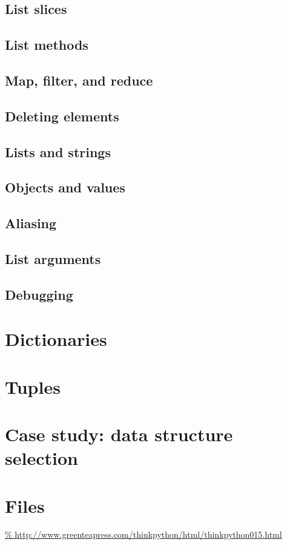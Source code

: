 \documentclass{article}
\begin{document}
\subsection{List slices}
\subsection{List methods}
\subsection{Map, filter, and reduce}
\subsection{Deleting elements}
\subsection{Lists and strings}
\subsection{Objects and values}
\subsection{Aliasing}
\subsection{List arguments}
\subsection{Debugging}


\section{Dictionaries}
\section{Tuples}
\section{Case study: data structure selection}
\section{Files}
\url{%
http://www.greenteapress.com/thinkpython/html/thinkpython015.html}
\end{document}

